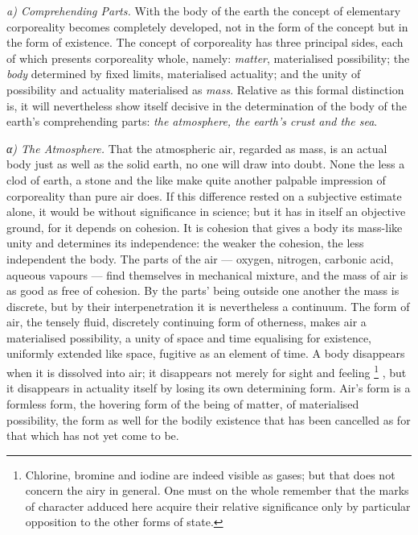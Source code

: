 \documentclass[12pt,a4paper]{book}
\newcommand{\runin}[1]{\emph{#1}\hspace{0.4em}}
\newcommand{\subrunin}[1]{\emph{#1}\hspace{0.4em}}
\begin{document}
\runin{a) Comprehending Parts.} With the body of the earth the concept of elementary corporeality becomes completely
developed, not in the form of the concept but in the form of existence. The concept of corporeality has three principal
sides, each of which presents corporeality whole, namely: \emph{matter}, materialised possibility; the \emph{body}
determined by fixed limits, materialised actuality; and the unity of possibility and actuality materialised as
\emph{mass}. Relative as this formal distinction is, it will nevertheless show itself decisive in the determination of
the body of the earth's comprehending parts: \emph{the atmosphere, the earth's crust and the sea}.

\subrunin{α) The Atmosphere.} That the atmospheric air, regarded as mass, is an actual body just as well as the solid
earth, no one will draw into doubt. None the less a clod of earth, a stone and the like make quite another palpable
impression of corporeality than pure air does. If this difference rested on a subjective estimate alone, it would be
without significance in science; but it has in itself an objective ground, for it depends on cohesion. It is cohesion
that gives a body its mass-like unity and determines its independence: the weaker the cohesion, the less independent the
body. The parts of the air --- oxygen, nitrogen, carbonic acid, aqueous vapours --- find themselves in mechanical
mixture, and the mass of air is as good as free of cohesion. By the parts' being outside one another the mass is
discrete, but by their interpenetration it is nevertheless a continuum. The form of air, the tensely fluid, discretely
continuing form of otherness, makes air a materialised possibility, a unity of space and time equalising for existence,
uniformly extended like space, fugitive as an element of time. A body disappears when
it is dissolved into air; it disappears not merely for sight and feeling%
\footnote{%
Chlorine, bromine and iodine are indeed visible as gases; but that does not concern the airy in general. One must on the
whole remember that the marks of character adduced here acquire their relative significance only by particular opposition
to the other forms of state.}%
, but it disappears in actuality itself by losing its own determining form. Air's form is a formless form, the hovering
form of the being of matter, of materialised possibility, the form as well for the bodily existence that has been
cancelled as for that which has not yet come to be.
\end{document}
